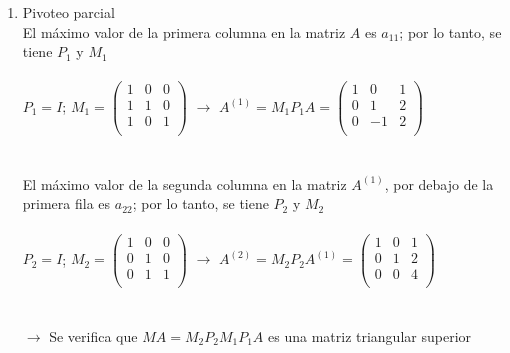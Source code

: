 \begin{enumerate}[]
    \begin{enumerate}[]
        \item Pivoteo parcial\\
        El máximo valor de la primera columna en la matriz $A$ es $a_{11}$; por lo tanto, se tiene $P_1$ y $M_1$\\
        \\
        $P_1 = I$; 
        $M_1 = \begin{pmatrix}
            1 & 0 & 0 \\ 
            1 & 1 & 0 \\
            1 & 0 & 1 \\
        \end{pmatrix} $ 
        $\xrightarrow{}$
        $A^{(1)}= M_1P_1A = \begin{pmatrix}
            1 & 0 & 1 \\ 
            0 & 1 & 2 \\
            0 & -1 & 2 \\
        \end{pmatrix}$
        \\\\\\
        El máximo valor de la segunda columna en la matriz $A^{(1)}$, por debajo de la primera fila es $a_{22}$; por lo tanto, se tiene $P_2$ y $M_2$\\\\
        $P_2 = I$; 
        $M_2 = \begin{pmatrix}
            1 & 0 & 0 \\ 
            0 & 1 & 0 \\
            0 & 1 & 1 \\
        \end{pmatrix} $ 
        $\xrightarrow{}$
        $A^{(2)}= M_2P_2A^{(1)} = \begin{pmatrix}
             1 & 0 & 1 \\ 
            0 & 1 & 2 \\
            0 & 0 & 4 \\
        \end{pmatrix}$
        \\\\\\
        $\xrightarrow{}$ Se verifica que $MA = M_2P_2M_1P_1A$ es una matriz triangular superior\\
        

\end{enumerate}
\end{enumerate}
